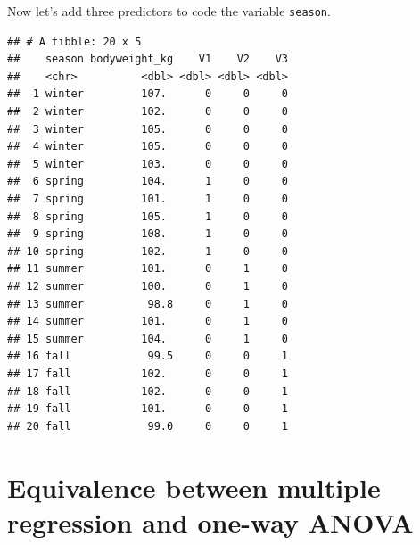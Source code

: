\documentclass[]{book}
\newenvironment{Shaded}{\begin{snugshade}}{\end{snugshade}}
\newcommand{\CommentTok}[1]{\textcolor[rgb]{0.56,0.35,0.01}{\textit{#1}}}
\newcommand{\DataTypeTok}[1]{\textcolor[rgb]{0.13,0.29,0.53}{#1}}
\newcommand{\DecValTok}[1]{\textcolor[rgb]{0.00,0.00,0.81}{#1}}
\newcommand{\KeywordTok}[1]{\textcolor[rgb]{0.13,0.29,0.53}{\textbf{#1}}}
\newcommand{\NormalTok}[1]{#1}
\newcommand{\OperatorTok}[1]{\textcolor[rgb]{0.81,0.36,0.00}{\textbf{#1}}}
\newcommand{\StringTok}[1]{\textcolor[rgb]{0.31,0.60,0.02}{#1}}
\begin{document}
Now let's add three predictors to code the variable \texttt{season}.

\begin{Shaded}
\end{Shaded}

\begin{verbatim}
## # A tibble: 20 x 5
##    season bodyweight_kg    V1    V2    V3
##    <chr>          <dbl> <dbl> <dbl> <dbl>
##  1 winter         107.      0     0     0
##  2 winter         102.      0     0     0
##  3 winter         105.      0     0     0
##  4 winter         105.      0     0     0
##  5 winter         103.      0     0     0
##  6 spring         104.      1     0     0
##  7 spring         101.      1     0     0
##  8 spring         105.      1     0     0
##  9 spring         108.      1     0     0
## 10 spring         102.      1     0     0
## 11 summer         101.      0     1     0
## 12 summer         100.      0     1     0
## 13 summer          98.8     0     1     0
## 14 summer         101.      0     1     0
## 15 summer         104.      0     1     0
## 16 fall            99.5     0     0     1
## 17 fall           102.      0     0     1
## 18 fall           102.      0     0     1
## 19 fall           101.      0     0     1
## 20 fall            99.0     0     0     1
\end{verbatim}

\hypertarget{equivalence-between-multiple-regression-and-one-way-anova}{%
\section{Equivalence between multiple regression and one-way ANOVA}\label{equivalence-between-multiple-regression-and-one-way-anova}}
\end{document}
